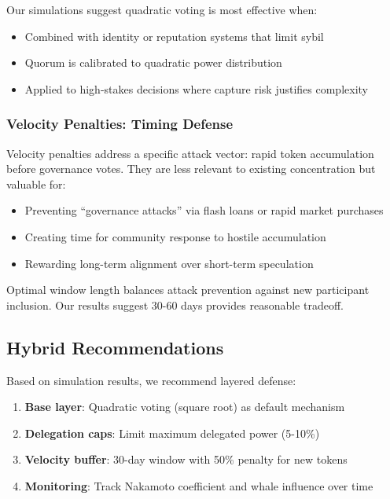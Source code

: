 Our simulations suggest quadratic voting is most effective when:
\begin{itemize}
    \item Combined with identity or reputation systems that limit sybil
    \item Quorum is calibrated to quadratic power distribution
    \item Applied to high-stakes decisions where capture risk justifies complexity
\end{itemize}

\subsubsection{Velocity Penalties: Timing Defense}

Velocity penalties address a specific attack vector: rapid token accumulation before governance votes. They are less relevant to existing concentration but valuable for:

\begin{itemize}
    \item Preventing ``governance attacks'' via flash loans or rapid market purchases
    \item Creating time for community response to hostile accumulation
    \item Rewarding long-term alignment over short-term speculation
\end{itemize}

Optimal window length balances attack prevention against new participant inclusion. Our results suggest 30-60 days provides reasonable tradeoff.

\subsection{Hybrid Recommendations}

Based on simulation results, we recommend layered defense:

\begin{enumerate}
    \item \textbf{Base layer}: Quadratic voting (square root) as default mechanism
    \item \textbf{Delegation caps}: Limit maximum delegated power (5-10\%)
    \item \textbf{Velocity buffer}: 30-day window with 50\% penalty for new tokens
    \item \textbf{Monitoring}: Track Nakamoto coefficient and whale influence over time
\end{enumerate}

